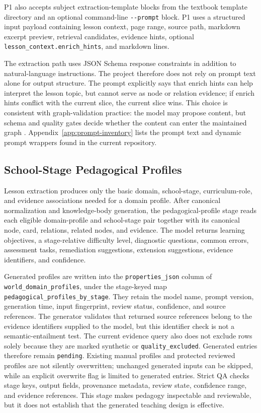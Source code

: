 \documentclass[11pt,letterpaper]{article}
\newcommand{\code}[1]{\nolinkurl{#1}}
\begin{document}
P1 also accepts subject extraction-template blocks from the textbook template directory and an optional command-line \code{--prompt} block. P1 uses a structured input payload containing lesson context, page range, source path, markdown excerpt preview, retrieval candidates, evidence hints, optional \code{lesson_context.enrich_hints}, and markdown lines.

The extraction path uses JSON Schema response constraints in addition to natural-language instructions. The project therefore does not rely on prompt text alone for output structure. The prompt explicitly says that enrich hints can help interpret the lesson topic, but cannot serve as node or relation evidence; if enrich hints conflict with the current slice, the current slice wins. This choice is consistent with graph-validation practice: the model may propose content, but schema and quality gates decide whether the content can enter the maintained graph \cite{shacl,hogan-kg}. Appendix~\ref{app:prompt-inventory} lists the prompt text and dynamic prompt wrappers found in the current repository.

\subsection{School-Stage Pedagogical Profiles}

Lesson extraction produces only the basic domain, school-stage, curriculum-role, and evidence associations needed for a domain profile. After canonical normalization and knowledge-body generation, the pedagogical-profile stage reads each eligible domain-profile and school-stage pair together with its canonical node, card, relations, related nodes, and evidence. The model returns learning objectives, a stage-relative difficulty level, diagnostic questions, common errors, assessment tasks, remediation suggestions, extension suggestions, evidence identifiers, and confidence.

Generated profiles are written into the \code{properties_json} column of \code{world_domain_profiles}, under the stage-keyed map \code{pedagogical_profiles_by_stage}. They retain the model name, prompt version, generation time, input fingerprint, review status, confidence, and source references. The generator validates that returned source references belong to the evidence identifiers supplied to the model, but this identifier check is not a semantic-entailment test. The current evidence query also does not exclude rows solely because they are marked synthetic or \code{quality_excluded}. Generated entries therefore remain \code{pending}. Existing manual profiles and protected reviewed profiles are not silently overwritten; unchanged generated inputs can be skipped, while an explicit overwrite flag is limited to generated entries. Strict QA checks stage keys, output fields, provenance metadata, review state, confidence range, and evidence references. This stage makes pedagogy inspectable and reviewable, but it does not establish that the generated teaching design is effective.
\end{document}
